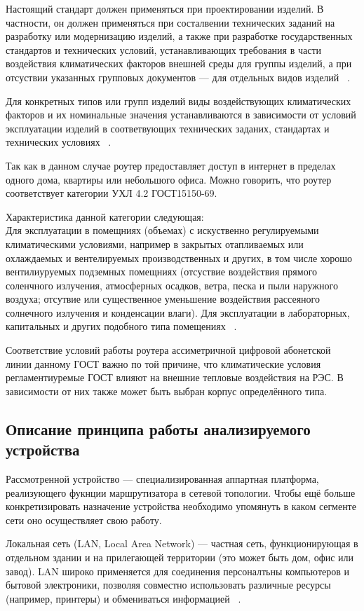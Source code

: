 Настоящий стандарт должен применяться при проектировании изделий.  В
частности, он должен применяться при состалвении технических заданий
на разработку или модернизацию изделий, а также при разработке
государственных стандартов и технических условий, устанавливающих
требования в части воздействия климатических факторов внешней среды
для группы изделий, а при отсуствии указанных групповых документов —
для отдельных видов изделий ~\cite{GOST_15150-69}.

Для конкретных типов или групп изделий виды воздействующих
климатических факторов и их номинальные значения устанавливаются в
зависимости от условий эксплуатации изделий в соответвующих
технических заданих, стандартах и технических условиях ~\cite{GOST_15150-69}.

Так как в данном случае роутер предоставляет доступ в интернет в
пределах одного дома, квартиры или небольшого офиса. Можно говорить, что роутер соответствует категории УХЛ 4.2 ГОСТ15150-69.

Характеристика данной категории следующая:\\
Для эксплуатации в помещниях (объемах) с искуственно регулируемыми
климатическими условиями, например в закрытых отапливаемых или
охлаждаемых и вентелируемых производственных и других, в том числе
хорошо вентилиуруемых подземных помещниях (отсуствие воздействия
прямого соленчного излучения, атмосферных осадков, ветра, песка и пыли
наружного воздуха; отсутвие или существенное уменьшение воздействия
рассеяного солнечного излучения и конденсации влаги). Для эксплуатации
в лабораторных, капитальных и других подобного типа помещениях ~\cite{GOST_15150-69}.

Соответствие условий работы роутера ассиметричной цифровой абонетской
линии данному ГОСТ важно по той причине, что климатические условия
регламентиуремые ГОСТ влияют на внешние тепловые воздействия на РЭС.
В зависимости от них также может быть выбран корпус определённого
типа.

\subsection{Описание принципа работы анализируемого устройства}


Рассмотренной устройство — специализированная аппартная платформа,
реализующего фукнции маршрутизатора в сетевой топологии.  Чтобы ещё
больше конкретизировать назначение устройства необходимо упомянуть в
каком сегменте сети оно осуществляет свою работу.


Локальная сеть (LAN, Local Area Network) — частная сеть,
функционирующая в отдельном здании и на прилегающей территории
(это может быть дом, офис или завод). LAN широко применяется для соединения персоналтьны компьютеров и бытовой электроники, позволяя совместно
использовать различные ресурсы (например, принтеры) и обмениваться
информацией ~\cite{NetworksTanenbaum2023}.

